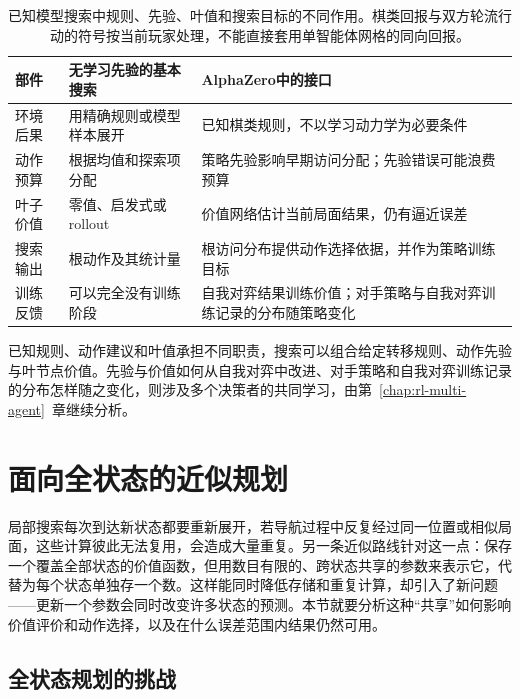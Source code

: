 \begin{table}[t]
 \centering
 \small
 \begin{tabularx}{\linewidth}{@{}l>{\raggedright\arraybackslash}X>{\raggedright\arraybackslash}X@{}}
  \toprule
  部件 & 无学习先验的基本搜索 & AlphaZero中的接口\\
  \midrule
  环境后果 & 用精确规则或模型样本展开 & 已知棋类规则，不以学习动力学为必要条件\\
  动作预算 & 根据均值和探索项分配 & 策略先验影响早期访问分配；先验错误可能浪费预算\\
  叶子价值 & 零值、启发式或rollout & 价值网络估计当前局面结果，仍有逼近误差\\
  搜索输出 & 根动作及其统计量 & 根访问分布提供动作选择依据，并作为策略训练目标\\
  训练反馈 & 可以完全没有训练阶段 & 自我对弈结果训练价值；对手策略与自我对弈训练记录的分布随策略变化\\
  \bottomrule
 \end{tabularx}
 \caption{已知模型搜索中规则、先验、叶值和搜索目标的不同作用。棋类回报与双方轮流行动的符号按当前玩家处理，不能直接套用单智能体网格的同向回报。}
 \label{tab:rl-planning-alphazero}
\end{table}

已知规则、动作建议和叶值承担不同职责，搜索可以组合给定转移规则、动作先验与叶节点价值。先验与价值如何从自我对弈中改进、对手策略和自我对弈训练记录的分布怎样随之变化，则涉及多个决策者的共同学习，由第~\ref{chap:rl-multi-agent}~章继续分析。

\section{面向全状态的近似规划}
\label{sec:rl-planning-global-approximation}

局部搜索每次到达新状态都要重新展开，若导航过程中反复经过同一位置或相似局面，这些计算彼此无法复用，会造成大量重复。另一条近似路线针对这一点：保存一个覆盖全部状态的价值函数，但用数目有限的、跨状态共享的参数来表示它，代替为每个状态单独存一个数。这样能同时降低存储和重复计算，却引入了新问题——更新一个参数会同时改变许多状态的预测。本节就要分析这种“共享”如何影响价值评价和动作选择，以及在什么误差范围内结果仍然可用。

\subsection{全状态规划的挑战}
\label{sec:rl-planning-global-budget}

